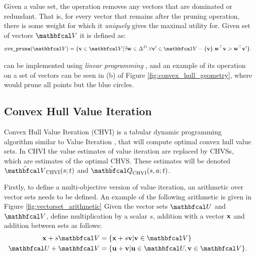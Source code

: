     Given a value set, the \cprune\ewe operation removes any vectors that are dominated or redundant. That is, for every vector that remains after the pruning operation, there is some weight for which it \textit{uniquely} gives the maximal utility for. Given set of vectors $\bfcl{V}$ it is defined as:
    \begin{align}
        \cprune(\bfcl{V}) = \{\bff{v}\in\bfcl{V} | \exists \bff{w}\in\Delta^D. \forall \bff{v}'\in\bfcl{V}-\{\bff{v}\}. \bff{w}^\top \bff{v} > \bff{w}^\top \bff{v}' \}. \label{eq:cprune_def}
    \end{align}

    \cprune\ewe can be implemented using \textit{linear programming} , and an example of its operation on a set of vectors can be seen in (b) of Figure \ref{fig:convex_hull_geometry}, where \cprune\ewe would prune all points but the blue circles.




    \subsection{Convex Hull Value Iteration}
    \label{sec:2-5-1-chvi}

        Convex Hull Value Iteration (CHVI) \cite{chvi} is a tabular dynamic programming algorithm similar to Value Iteration , that will compute optimal convex hull value sets. In CHVI the value estimates of value iteration are replaced by CHVSs, which are estimates of the optimal CHVS. These estimates will be denoted $\Vchvi(s;t)$ and $\Qchvi(s,a;t)$.

        Firstly, to define a multi-objective version of value iteration, an arithmetic over vector sets needs to be defined. An example of the following arithmetic is given in Figure \ref{fig:vectorset_arithmetic} Given the vector sets $\bfcl{U}$ and $\bfcl{V}$, define multiplication by a scalar $s$, addition with a vector $\mathbf{x}$ and addition between sets as follows:
        \begin{align}
            \bff{x} + s\bfcl{V} &= \{\bff{x} + s\bff{v} | \bff{v}\in\bfcl{V} \} \label{eq:vector_set_arithmetic_one} \\
            \bfcl{U} + \bfcl{V} &= \{ \bff{u}+\bff{v} | \bff{u}\in\bfcl{U}, \bff{v}\in\bfcl{V} \}. \label{eq:vector_set_arithmetic_two} 
        \end{align}

